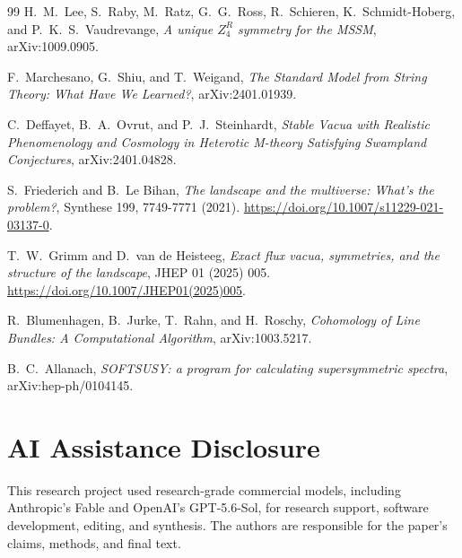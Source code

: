 \documentclass[11pt]{article}
\theoremstyle{remark}
\theoremstyle{plain}
\begin{document}
\begin{thebibliography}{99}
H.\ M.\ Lee, S.\ Raby, M.\ Ratz, G.\ G.\ Ross, R.\ Schieren, K.\ Schmidt-Hoberg, and
P.\ K.\ S.\ Vaudrevange,
\emph{A unique \(Z_4^R\) symmetry for the MSSM},
arXiv:1009.0905.

F.\ Marchesano, G.\ Shiu, and T.\ Weigand,
\emph{The Standard Model from String Theory: What Have We Learned?},
arXiv:2401.01939.

C.\ Deffayet, B.\ A.\ Ovrut, and P.\ J.\ Steinhardt,
\emph{Stable Vacua with Realistic Phenomenology and Cosmology in Heterotic M-theory Satisfying Swampland Conjectures},
arXiv:2401.04828.

S.\ Friederich and B.\ Le Bihan,
\emph{The landscape and the multiverse: What's the problem?},
Synthese 199, 7749-7771 (2021).
\url{https://doi.org/10.1007/s11229-021-03137-0}.

T.\ W.\ Grimm and D.\ van de Heisteeg,
\emph{Exact flux vacua, symmetries, and the structure of the landscape},
JHEP 01 (2025) 005.
\url{https://doi.org/10.1007/JHEP01(2025)005}.

R.\ Blumenhagen, B.\ Jurke, T.\ Rahn, and H.\ Roschy,
\emph{Cohomology of Line Bundles: A Computational Algorithm},
arXiv:1003.5217.

B.\ C.\ Allanach,
\emph{SOFTSUSY: a program for calculating supersymmetric spectra},
arXiv:hep-ph/0104145.

\end{thebibliography}

\section*{AI Assistance Disclosure}
This research project used research-grade commercial models, including
Anthropic's Fable and OpenAI's GPT-5.6-Sol, for research support, software
development, editing, and synthesis. The authors are responsible for the
paper's claims, methods, and final text.
\end{document}
